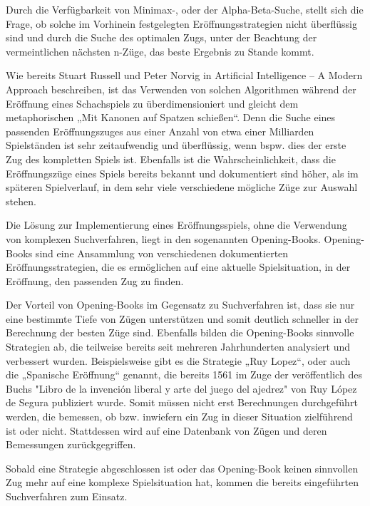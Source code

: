 Durch die Verfügbarkeit von Minimax-, oder der Alpha-Beta-Suche, stellt sich die Frage, ob solche im Vorhinein festgelegten Eröffnungsstrategien nicht überflüssig sind und durch die Suche des optimalen Zugs, unter der Beachtung der vermeintlichen nächsten n-Züge, das beste Ergebnis zu Stande kommt.

Wie bereits Stuart Russell und Peter Norvig in Artificial Intelligence – A Modern Approach beschreiben, ist das Verwenden von solchen Algorithmen während der Eröffnung eines Schachspiels zu überdimensioniert und gleicht dem metaphorischen „Mit Kanonen auf Spatzen schießen“. Denn die Suche eines passenden Eröffnungszuges aus einer Anzahl von etwa einer Milliarden Spielständen ist sehr zeitaufwendig und überflüssig, wenn bspw. dies der erste Zug des kompletten Spiels ist. Ebenfalls ist die Wahrscheinlichkeit, dass die Eröffnungszüge eines Spiels bereits bekannt und dokumentiert sind höher, als im späteren Spielverlauf, in dem sehr viele verschiedene mögliche Züge zur Auswahl stehen.\cite{Russell2010}


Die Lösung zur Implementierung eines Eröffnungsspiels, ohne die Verwendung von komplexen Suchverfahren, liegt in den sogenannten Opening-Books. Opening-Books sind eine Ansammlung von verschiedenen dokumentierten Eröffnungsstrategien, die es ermöglichen auf eine aktuelle Spielsituation, in der Eröffnung, den passenden Zug zu finden.

Der Vorteil von Opening-Books im Gegensatz zu Suchverfahren ist, dass sie nur eine bestimmte Tiefe von Zügen unterstützen und somit deutlich schneller in der Berechnung der besten Züge sind. Ebenfalls bilden die Opening-Books sinnvolle Strategien ab, die teilweise bereits seit mehreren Jahrhunderten analysiert und verbessert wurden. Beispielsweise gibt es die Strategie „Ruy Lopez“, oder auch die „Spanische Eröffnung“ genannt, die bereits 1561 im Zuge der veröffentlich des Buchs "Libro de la invención liberal y arte del juego del ajedrez" von Ruy López de Segura publiziert wurde. Somit müssen nicht erst Berechnungen durchgeführt werden, die bemessen, ob bzw. inwiefern ein Zug in dieser Situation zielführend ist oder nicht. Stattdessen wird auf eine Datenbank von Zügen und deren Bemessungen zurückgegriffen.


Sobald eine Strategie abgeschlossen ist oder das Opening-Book keinen sinnvollen Zug mehr auf eine komplexe Spielsituation hat, kommen die bereits eingeführten Suchverfahren zum Einsatz.


